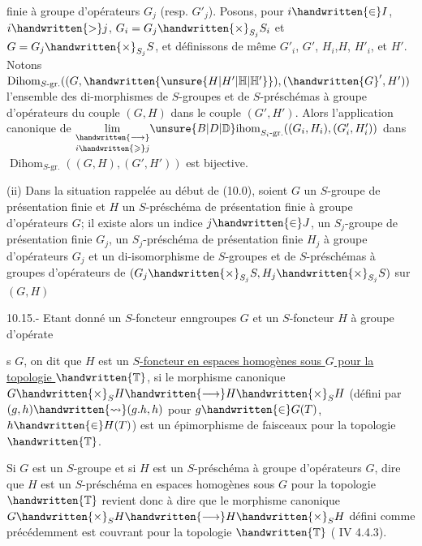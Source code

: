 finie à groupe d'opérateurs $G_j$ (resp. $G'_j$). Posons, pour $i\handwritten{\in}I$, $i\handwritten{>}j$, $G_i=G_j\handwritten{\times}_{S_j}S_i$ et $G=G_j\handwritten{\times}_{S_j}S$, et définissons de même $G'_i$, $G'$, $H_i$,$H$, $H'_i$, et $H'$. Notons $\operatorname{Dihom}_{S\text{-gr.}}((G,\handwritten{\unsure{H|H'|\mathbb{H}|\mathbb{H}'}}),(\handwritten{G}',H'))$ l'ensemble des di-morphismes de $S$-groupes et de $S$-préschémas à groupe d'opérateurs du couple $(G,H)$ dans le couple $(G',H')$. Alors l'application canonique de $\underset{i\handwritten{\geqslant}j}{\underset{\handwritten{\longrightarrow}}{\lim}}{\unsure{B|D|\mathbb{D}}\mathrm{ihom}}_{S_i\text{-gr.}}((G_i,H_i),(G'_i,H'_i))$ dans $\operatorname{Dihom}_{S\text{-gr.}}((G,H),(G',H'))$ est bijective.

(ii) Dans la situation rappelée au début de (10.0), soient $G$ un $S$-groupe  de présentation finie et $H$ un $S$-préschéma de présentation finie à groupe d'opérateurs $G$; il existe alors un indice $j\handwritten{\in}J$, un $S_j$-groupe de présentation finie $G_j$, un $S_j$-préschéma de présentation finie $H_j$ à groupe d'opérateurs $G_j$ et un di-isomorphisme de $S$-groupes et de $S$-préschémas à groupes d'opérateurs de $(G_j\handwritten{\times}_{S_j}S,H_j\handwritten{\times}_{S_j}S)$ sur$(G,H)$

 10.15.- Etant donné un $S$-foncteur enngroupes $G$ et un $S$-foncteur $H$ à groupe d'opérates $G$, on dit que $H$ est un \uline{$S$-foncteur en espaces homogènes sous $G$ pour la topologie $\handwritten{\mathbb{T}}$}, si le morphisme canonique $G\handwritten{\times}_S H\handwritten{\longrightarrow}H\handwritten{\times}_S H$ (défini par $(g,h)\handwritten{\rightsquigarrow}(g.h,h)$ pour $g\handwritten{\in}G(T)$, $h\handwritten{\in}H(T)$) est un épimorphisme de faisceaux pour la topologie $\handwritten{\mathbb{T}}$.

Si $G$ est un $S$-groupe et si $H$ est un $S$-préschéma à  groupe d'opérateurs $G$, dire que $H$ est un $S$-préschéma en espaces homogènes sous $G$ pour la topologie $\handwritten{\mathbb{T}}$ revient donc à dire que le morphisme canonique $G\handwritten{\times}_S H\handwritten{\longrightarrow}H\handwritten{\times}_S H$ défini comme précédemment est couvrant pour la topologie $\handwritten{\mathbb{T}}$ ( IV 4.4.3).

